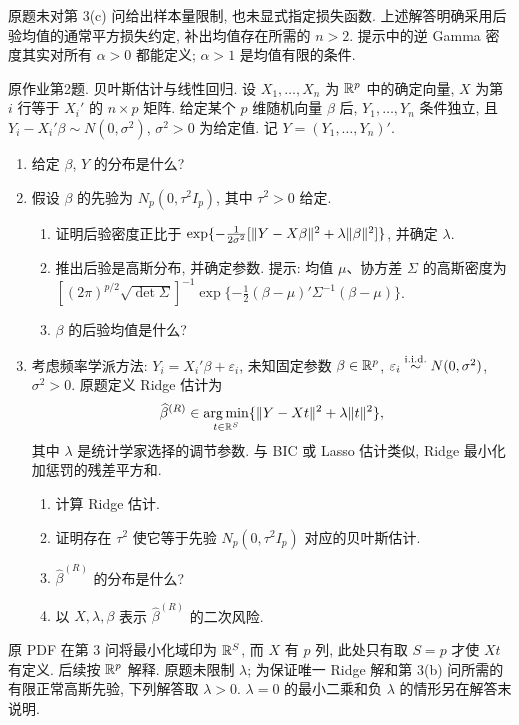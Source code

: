 \begin{remark}
原题未对第 3(c) 问给出样本量限制, 也未显式指定损失函数. 上述解答明确采用后验均值的通常平方损失约定, 补出均值存在所需的 $n>2$. 提示中的逆 Gamma 密度其实对所有 $\alpha>0$ 都能定义; $\alpha>1$ 是均值有限的条件.
\end{remark}

\begin{exercise}\label{ps10:p02}
原作业第2题. 贝叶斯估计与线性回归.
设 $X_1,\ldots,X_n$ 为 $\mathbb R^p$ 中的确定向量, $X$ 为第 $i$ 行等于 $X_i'$ 的 $n\times p$ 矩阵. 给定某个 $p$ 维随机向量 $\beta$ 后, $Y_1,\ldots,Y_n$ 条件独立, 且 $Y_i-X_i'\beta\sim N(0,\sigma^2)$, $\sigma^2>0$ 为给定值. 记 $Y=(Y_1,\ldots,Y_n)'$.
\begin{enumerate}[label=\arabic*.]
\item 给定 $\beta$, $Y$ 的分布是什么?
\item 假设 $\beta$ 的先验为 $N_p(0,\tau^2 I_p)$, 其中 $\tau^2>0$ 给定.
\begin{enumerate}[label=\alph*)]
\item 证明后验密度正比于 $\exp\{-\frac1{2\sigma^2}[\lVert Y-X\beta\rVert^2+\lambda\lVert \beta\rVert^2]\}$, 并确定 $\lambda$.
\item 推出后验是高斯分布, 并确定参数. 提示: 均值 $\mu$、协方差 $\Sigma$ 的高斯密度为 $[(2\pi)^{p/2}\sqrt{\det\Sigma}]^{-1}\exp\{-\frac12(\beta-\mu)'\Sigma^{-1}(\beta-\mu)\}$.
\item $\beta$ 的后验均值是什么?
\end{enumerate}
\item 考虑频率学派方法: $Y_i=X_i'\beta+\varepsilon_i$, 未知固定参数 $\beta\in\mathbb R^p$, $\varepsilon_i\stackrel{\mathrm{i.i.d.}}{\sim} N(0,\sigma^2)$, $\sigma^2>0$. 原题定义 Ridge 估计为
\[
\widehat\beta^{(R)}\in\operatorname*{arg\,min}_{t\in\mathbb R^S}
\{\lVert Y-Xt\rVert^2+\lambda\lVert t\rVert^2\},
\]
其中 $\lambda$ 是统计学家选择的调节参数. 与 BIC 或 Lasso 估计类似, Ridge 最小化加惩罚的残差平方和.
\begin{enumerate}[label=\alph*)]
\item 计算 Ridge 估计.
\item 证明存在 $\tau^2$ 使它等于先验 $N_p(0,\tau^2 I_p)$ 对应的贝叶斯估计.
\item $\widehat\beta^{(R)}$ 的分布是什么?
\item 以 $X,\lambda,\beta$ 表示 $\widehat\beta^{(R)}$ 的二次风险.
\end{enumerate}
\end{enumerate}
\end{exercise}
\begin{remark}
原 PDF 在第 3 问将最小化域印为 $\mathbb R^S$, 而 $X$ 有 $p$ 列, 此处只有取 $S=p$ 才使 $Xt$ 有定义. 后续按 $\mathbb R^p$ 解释. 原题未限制 $\lambda$; 为保证唯一 Ridge 解和第 3(b) 问所需的有限正常高斯先验, 下列解答取 $\lambda>0$. $\lambda=0$ 的最小二乘和负 $\lambda$ 的情形另在解答末说明.
\end{remark}
